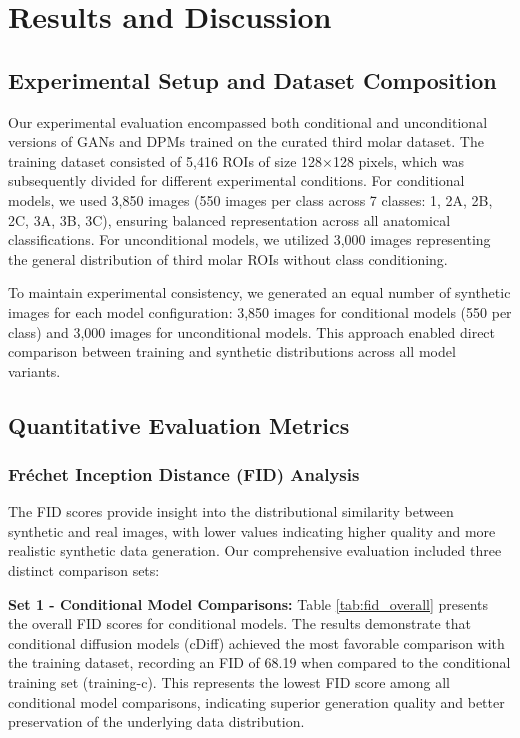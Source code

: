
\section{Results and Discussion}

\subsection{Experimental Setup and Dataset Composition}

Our experimental evaluation encompassed both conditional and unconditional versions of GANs and DPMs trained on the curated third molar dataset. The training dataset consisted of 5,416 ROIs of size 128×128 pixels, which was subsequently divided for different experimental conditions. For conditional models, we used 3,850 images (550 images per class across 7 classes: 1, 2A, 2B, 2C, 3A, 3B, 3C), ensuring balanced representation across all anatomical classifications. For unconditional models, we utilized 3,000 images representing the general distribution of third molar ROIs without class conditioning.

To maintain experimental consistency, we generated an equal number of synthetic images for each model configuration: 3,850 images for conditional models (550 per class) and 3,000 images for unconditional models. This approach enabled direct comparison between training and synthetic distributions across all model variants.

\subsection{Quantitative Evaluation Metrics}

\subsubsection{Fréchet Inception Distance (FID) Analysis}

The FID scores provide insight into the distributional similarity between synthetic and real images, with lower values indicating higher quality and more realistic synthetic data generation. Our comprehensive evaluation included three distinct comparison sets:

\textbf{Set 1 - Conditional Model Comparisons:} Table \ref{tab:fid_overall} presents the overall FID scores for conditional models. The results demonstrate that conditional diffusion models (cDiff) achieved the most favorable comparison with the training dataset, recording an FID of 68.19 when compared to the conditional training set (training-c). This represents the lowest FID score among all conditional model comparisons, indicating superior generation quality and better preservation of the underlying data distribution.


